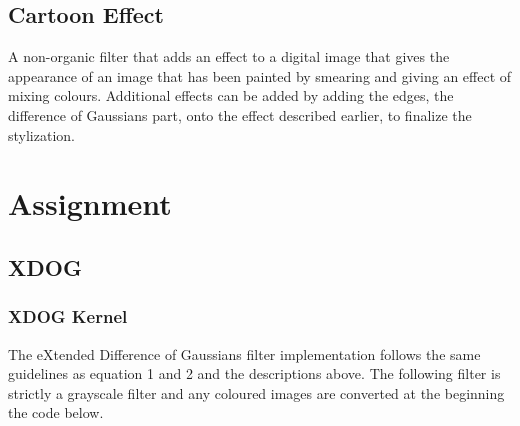 \documentclass{article}
\begin{document}
	\subsection{Cartoon Effect}
	
	A non-organic filter that adds an effect to a digital image that gives the appearance of an image that has been painted by smearing and giving an effect of mixing colours. Additional effects can be added by adding the edges, the difference of Gaussians part, onto the effect described earlier, to finalize the stylization.
	
	\section{Assignment}
	
	\subsection{XDOG}
	
	\subsubsection{XDOG Kernel}
	
	The eXtended Difference of Gaussians filter implementation follows the same guidelines as equation 1 and 2 and the descriptions above. The following filter is strictly a grayscale filter and any coloured images are converted at the beginning the code below.\\
		
\end{document}
